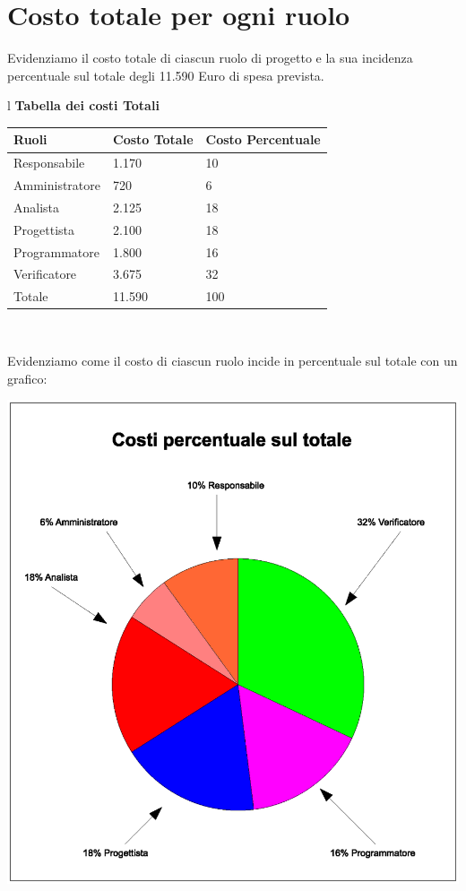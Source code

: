 \documentclass[11pt,titlepage,a4paper]{report}
\begin{document}
\section{Costo totale per ogni ruolo}
Evidenziamo il costo totale di ciascun ruolo di progetto e la sua incidenza
percentuale sul totale degli 11.590 Euro di spesa prevista.
\begin{table}[hbtp]
\large{
\begin{tabular}{l}
\Large{\textbf{\textsf{Tabella dei costi Totali}}} \\
\begin{tabular}{||p{4cm}||p{3cm}||p{3cm}||}
\hline
\textbf{Ruoli} & \textbf{Costo Totale}& \textbf{Costo Percentuale}\\
\hline
{Responsabile}&1.170&10\\ 
\hline 
{Amministratore} &720&6\\ 
\hline
{Analista} &2.125&18 \\
\hline
{Progettista} &2.100&18 \\
\hline
{Programmatore} &1.800&16\\
\hline
{Verificatore} &3.675&32 \\
\hline
{Totale} &11.590&100 \\
\hline
\end{tabular} \\
\end{tabular}
}
\end{table}

Evidenziamo come il costo di ciascun ruolo incide in percentuale
sul totale con un grafico:

\begin{center}
\includegraphics [width=1\textwidth] {CostiPercentuali.eps}
\end{center}
\end{document}
